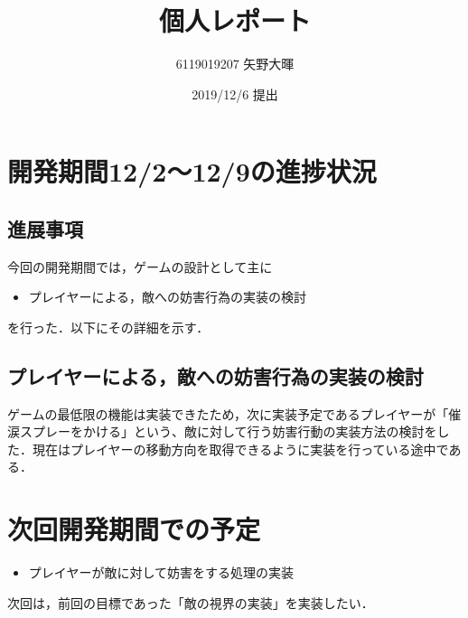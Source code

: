 \documentclass{jarticle}
\title{個人レポート}
\author{6119019207 矢野大暉}
\date{2019/12/6 提出}
\newcommand{\xe}{プレイヤーによる，敵への妨害行為の実装の検討}
\newcommand{\pitem}[1]{
\item #1
}
\begin{document}
\maketitle

\section{開発期間12/2～12/9の進捗状況} 
\subsection{進展事項}
今回の開発期間では，ゲームの設計として主に
\begin{itemize}
\pitem{\xe}
\end{itemize}
を行った．以下にその詳細を示す．

\subsection{\xe}
ゲームの最低限の機能は実装できたため，次に実装予定であるプレイヤーが「催涙スプレーをかける」という、敵に対して行う妨害行動の実装方法の検討をした．現在はプレイヤーの移動方向を取得できるように実装を行っている途中である．

\section{次回開発期間での予定}
\begin{itemize}
\item プレイヤーが敵に対して妨害をする処理の実装
\end{itemize}

次回は，前回の目標であった「敵の視界の実装」を実装したい．
\end{document}
